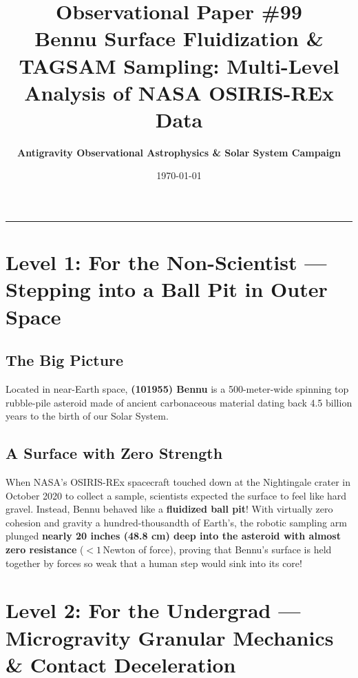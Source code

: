 \documentclass[11pt,a4paper]{article}
\title{\Huge \textbf{Observational Paper \#99}\\ \Large Bennu Surface Fluidization \& TAGSAM Sampling: Multi-Level Analysis of NASA OSIRIS-REx Data}
\author{\textbf{Antigravity Observational Astrophysics \& Solar System Campaign}}
\date{\today}
\begin{document}
\maketitle

\vspace{-1em}
\begin{center}
\rule{\textwidth}{1.5pt}
\end{center}

\section*{Level 1: For the Non-Scientist — Stepping into a Ball Pit in Outer Space}

\subsection*{The Big Picture}
Located in near-Earth space, \textbf{(101955) Bennu} is a 500-meter-wide spinning top rubble-pile asteroid made of ancient carbonaceous material dating back 4.5 billion years to the birth of our Solar System.

\subsection*{A Surface with Zero Strength}
When NASA's OSIRIS-REx spacecraft touched down at the Nightingale crater in October 2020 to collect a sample, scientists expected the surface to feel like hard gravel. Instead, Bennu behaved like a \textbf{fluidized ball pit}! With virtually zero cohesion and gravity a hundred-thousandth of Earth's, the robotic sampling arm plunged \textbf{nearly 20 inches (48.8 cm) deep into the asteroid with almost zero resistance} ($< 1\,\text{Newton}$ of force), proving that Bennu's surface is held together by forces so weak that a human step would sink into its core!

\newpage

\section*{Level 2: For the Undergrad — Microgravity Granular Mechanics \& Contact Deceleration}
\end{document}
